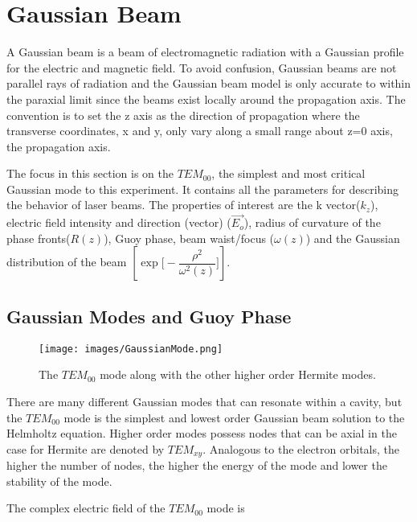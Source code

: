 \documentclass[a4paper]{book}
\begin{document}
	\section{Gaussian Beam}
		\label{sec:Gaussian Beam}
		A Gaussian beam is a beam of electromagnetic radiation with a Gaussian profile for the electric and magnetic field. 
		To avoid confusion, Gaussian beams are not parallel rays of radiation and the Gaussian beam model is only accurate to within the paraxial limit since the beams exist locally around the propagation axis.
		The convention is to set the z axis as the direction of propagation where the transverse coordinates, x and y, only vary along a small range about z=0 axis, the propagation axis.
		
		The focus in this section is on the $TEM_{00}$, the simplest and most critical Gaussian mode to this experiment. It contains all the parameters for describing the behavior of laser beams. The properties of interest are the k vector($k_z$), electric field intensity and direction (vector) ($\vec{E_o}$), radius of curvature of the phase fronts($R(z)$), Guoy phase, beam waist/focus ($\omega(z)$) and the Gaussian distribution of the beam $\left[ \exp{\bigg[-\dfrac{\rho^2}{\omega^2(z)}\bigg]}\right]$.
		\subsection{Gaussian Modes and Guoy Phase}
			\label{subsec:Gaussian Modes and Guoy Phase}
			
			\begin{figure} 
				\centering
				\texttt{[image: images/GaussianMode.png]}
				\caption{\cite{hermite} \cite{Laguerre} The $TEM_{00}$ mode along with the other higher order Hermite modes.}
				\label{fig:Hermite-gaussian}	
			\end{figure}
			
			There are many different Gaussian modes that can resonate within a cavity, but the $TEM_{00}$ mode is the simplest and lowest order Gaussian beam solution to the Helmholtz equation. 
			Higher order modes possess nodes that can be axial in the case for Hermite are denoted by $TEM_{xy}$. Analogous to the electron orbitals, the higher the number of nodes, the higher the energy of the mode and lower the stability of the mode.
			
			The complex electric field of the $TEM_{00}$ mode is 
			
\end{document}
